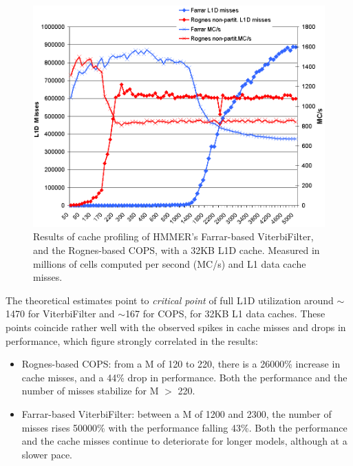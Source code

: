 \begin{figure}[htb!]
	\centering
	\includegraphics[width=16cm]{graphics/cache-misses-nonpart.png} 
	\caption[Cache profiling of non-partitioned models]  {Results of cache profiling of HMMER's Farrar-based ViterbiFilter, and the Rognes-based COPS, with a 32KB L1D cache. Measured in millions of cells computed per second (MC/s) and L1 data cache misses.}
	\label{cache-misses-nonpart}
\end{figure}

The theoretical estimates point to \emph{critical point} of full L1D utilization around $\sim$1470 for ViterbiFilter and $\sim$167 for COPS, for 32KB L1 data caches. These points coincide rather well with the observed spikes in cache misses and drops in performance, which figure strongly correlated in the results:

\begin{itemize}[noitemsep,nolistsep]

\item Rognes-based COPS: from a M of 120 to 220, there is a 26000\% increase in cache misses, and a 44\% drop in performance. Both the performance and the number of misses stabilize for M $>$ 220.

\item Farrar-based ViterbiFilter: between a M of 1200 and 2300, the number of misses rises 50000\% with the performance falling 43\%. Both the performance and the cache misses continue to deteriorate for longer models, although at a slower pace.

\end{itemize}

